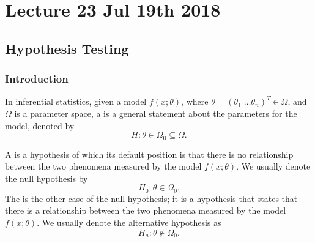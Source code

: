 \documentclass[notoc,notitlepage]{tufte-book}
\begin{document}



\chapter{Lecture 23 Jul 19th 2018}%
\label{chp:lecture_23_jul_19th_2018}

\section{Hypothesis Testing}%
\label{sec:hypothesis_testing}

\subsection{Introduction}%
\label{sub:introduction}

\begin{defn}[Hypothesis]
\label{defn:hypothesis}
  In inferential statistics, given a model $f(x; \theta)$, where $\theta = (\theta_1 \; \hdots \theta_n)^T \in \Omega$, and $\Omega$ is a parameter space, a  is a general statement about the parameters for the model, denoted by
  \begin{equation*}
    H : \theta \in \Omega_0 \subseteq \Omega.
  \end{equation*}
\end{defn}

\begin{defn}
\label{defn:null_hypothesis_and_alternative_hypothesis}
  A  is a hypothesis of which its default position is that there is no relationship between the two phenomena measured by the model $f(x; \theta)$. We usually denote the null hypothesis by
  \begin{equation*}
    H_0 : \theta \in \Omega_0.
  \end{equation*}
  The  is the other case of the null hypothesis; it is a hypothesis that states that there is a relationship between the two phenomena measured by the model $f(x; \theta)$. We usually denote the alternative hypothesis as
  \begin{equation*}
    H_a : \theta \notin \Omega_0.
  \end{equation*}
\end{defn}
\end{document}
